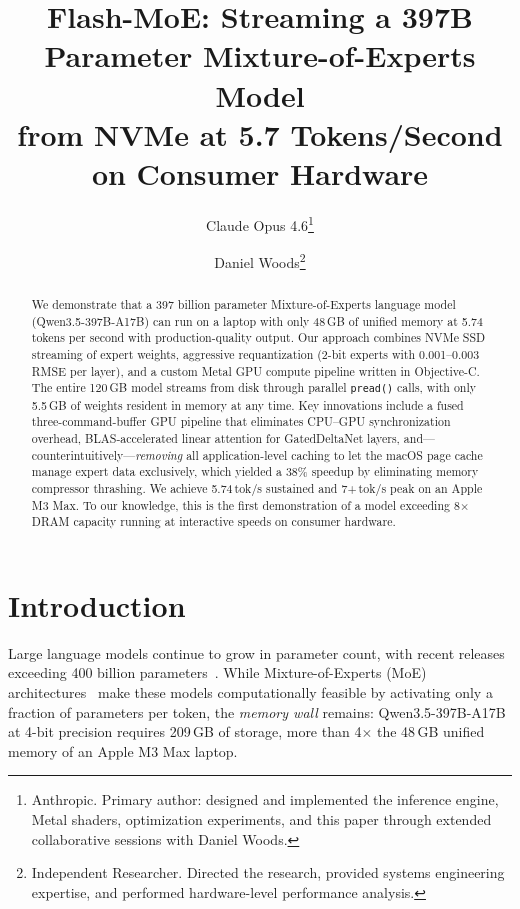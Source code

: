 \documentclass[11pt,twocolumn]{article}
\title{\textbf{Flash-MoE: Streaming a 397B Parameter Mixture-of-Experts Model\\ from NVMe at 5.7 Tokens/Second on Consumer Hardware}}
\author{
    Claude Opus 4.6\thanks{Anthropic. Primary author: designed and implemented the inference engine, Metal shaders, optimization experiments, and this paper through extended collaborative sessions with Daniel Woods.} \and
    Daniel Woods\thanks{Independent Researcher. Directed the research, provided systems engineering expertise, and performed hardware-level performance analysis.}
}
\date{}
\begin{document}
\maketitle

\begin{abstract}
We demonstrate that a 397 billion parameter Mixture-of-Experts language model (Qwen3.5-397B-A17B) can run on a laptop with only 48\,GB of unified memory at 5.74 tokens per second with production-quality output.
Our approach combines NVMe SSD streaming of expert weights, aggressive requantization (2-bit experts with 0.001--0.003 RMSE per layer), and a custom Metal GPU compute pipeline written in Objective-C.
The entire 120\,GB model streams from disk through parallel \texttt{pread()} calls, with only 5.5\,GB of weights resident in memory at any time.
Key innovations include a fused three-command-buffer GPU pipeline that eliminates CPU--GPU synchronization overhead, BLAS-accelerated linear attention for GatedDeltaNet layers, and---counterintuitively---\emph{removing} all application-level caching to let the macOS page cache manage expert data exclusively, which yielded a 38\% speedup by eliminating memory compressor thrashing.
We achieve 5.74\,tok/s sustained and 7+\,tok/s peak on an Apple M3 Max.
To our knowledge, this is the first demonstration of a model exceeding 8$\times$ DRAM capacity running at interactive speeds on consumer hardware.
\end{abstract}

\section{Introduction}

Large language models continue to grow in parameter count, with recent releases exceeding 400 billion parameters~\cite{yang2025qwen3}.
While Mixture-of-Experts (MoE) architectures~\cite{jiang2024mixtral} make these models computationally feasible by activating only a fraction of parameters per token, the \emph{memory wall} remains: Qwen3.5-397B-A17B at 4-bit precision requires 209\,GB of storage, more than 4$\times$ the 48\,GB unified memory of an Apple M3 Max laptop.
\end{document}

